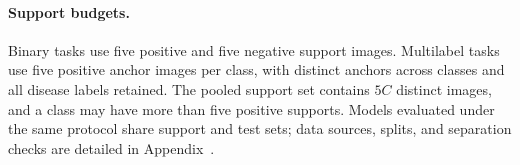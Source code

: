 \documentclass[10pt,twocolumn,letterpaper]{article}
\begin{document}

\paragraph{Support budgets.}
Binary tasks use five positive and five negative support images. Multilabel tasks use five positive anchor images per class, with distinct anchors across classes and all disease labels retained. The pooled support set contains $5C$ distinct images, and a class may have more than five positive supports. Models evaluated under the same protocol share support and test sets; data sources, splits, and separation checks are detailed in Appendix~.
\end{document}

